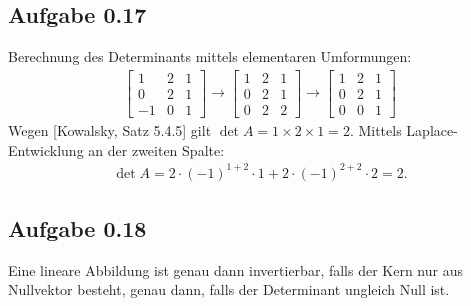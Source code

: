 \subsection*{Aufgabe 0.17}
Berechnung des Determinants mittels elementaren Umformungen:
\begin{align*}
  \begin{bmatrix}
    1 & 2 & 1 \\
    0 & 2 & 1 \\
    -1 & 0 & 1
  \end{bmatrix} \to
  \begin{bmatrix}
    1 & 2 & 1 \\
    0 & 2 & 1 \\
    0 & 2 & 2
  \end{bmatrix} \to
  \begin{bmatrix}
    1 & 2 & 1 \\
    0 & 2 & 1 \\
    0 & 0 & 1
  \end{bmatrix}
\end{align*}
Wegen [Kowalsky, Satz 5.4.5] gilt \(\det A = 1 \times 2 \times 1 = 2\).
Mittels Laplace-Entwicklung an der zweiten Spalte:
\begin{align*}
  \det A = 2 \cdot (-1)^{1+2}\cdot 1 + 2 \cdot (-1)^{2+2} \cdot 2 = 2.
\end{align*}
\subsection*{Aufgabe 0.18}
Eine lineare Abbildung ist genau dann invertierbar, falls der Kern nur
aus Nullvektor besteht, genau dann, falls der Determinant ungleich
Null ist.

